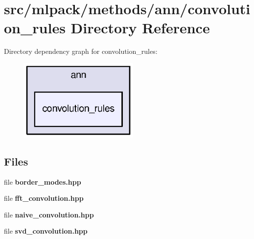 \section{src/mlpack/methods/ann/convolution\+\_\+rules Directory Reference}
\label{dir_64bc63d1017c5e75bed2c1b83e1d3fb2}
Directory dependency graph for convolution\+\_\+rules\+:
\nopagebreak
\begin{figure}[H]
\begin{center}
\leavevmode
\includegraphics[width=168pt]{dir_64bc63d1017c5e75bed2c1b83e1d3fb2_dep}
\end{center}
\end{figure}
\subsection*{Files}
\begin{DoxyCompactItemize}
\item 
file {\bf border\+\_\+modes.\+hpp}
\item 
file {\bf fft\+\_\+convolution.\+hpp}
\item 
file {\bf naive\+\_\+convolution.\+hpp}
\item 
file {\bf svd\+\_\+convolution.\+hpp}
\end{DoxyCompactItemize}

